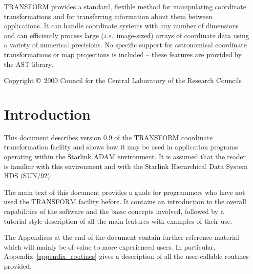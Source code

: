 \documentclass[twoside,11pt]{article}
\newcommand{\stardocinitials}  {SUN}
\newcommand{\stardoccopyright}
{Copyright \copyright\ 2000 Council for the Central Laboratory of the Research Councils}
\newcommand{\stardocnumber}    {61.4}
\newcommand{\stardocabstract}  {%

TRANSFORM provides a standard, flexible method for manipulating
coordinate transformations and for transferring information about them
between applications.  It can handle coordinate systems with any number
of dimensions and can efficiently process large
(\emph{i.e.}\ image-sized) arrays of coordinate data using a variety of
numerical precisions.  No specific support for astronomical coordinate
transformations or map projections is included -- these features are
provided by the \xref{AST}{sun210}{} library.

}
\newcommand{\stardocname}{\stardocinitials /\stardocnumber}
\newenvironment{latexonly}{}{}
\newcommand{\xref}[3]{#1}
\newcommand{\xlabel}[1]{}
\renewcommand{\_}{\texttt{\symbol{95}}}
\newcommand{\name}[1]{\mbox{\small{#1}}}
\renewcommand{\thepage}{\roman{page}}
\begin{document}
\stardocabstract

\begin{latexonly}
\newpage
\vspace*{\fill}
\stardoccopyright
\end{latexonly}

  \newpage
  \begin{latexonly}
    \setlength{\parskip}{0mm}
    \tableofcontents
    \setlength{\parskip}{\medskipamount}
    \markboth{\stardocname}{\stardocname}
  \end{latexonly}

\cleardoublepage
\renewcommand{\thepage}{\arabic{page}}
\setcounter{page}{1}


\section{\xlabel{introduction}Introduction}

This document describes version 0.9 of the \name{TRANSFORM} coordinate
transformation facility and shows how it may be used in application programs
operating within the Starlink \name{ADAM} environment.
It is assumed that the reader is familiar with this environment and with the
Starlink Hierarchical Data System \name{HDS} (\xref{SUN/92}{sun92}{}).

The main text of this document provides a guide for programmers who have not
used the \name{TRANSFORM} facility before.
It contains an introduction to the overall capabilities of the software and
the basic concepts involved, followed by a tutorial-style description of all
the main features with examples of their use.

The Appendices at the end of the document contain further reference material
which will mainly be of value to more experienced users.
In particular, Appendix~\ref{appendix_routines} gives a description of all
the user-callable routines provided.
\end{document}
